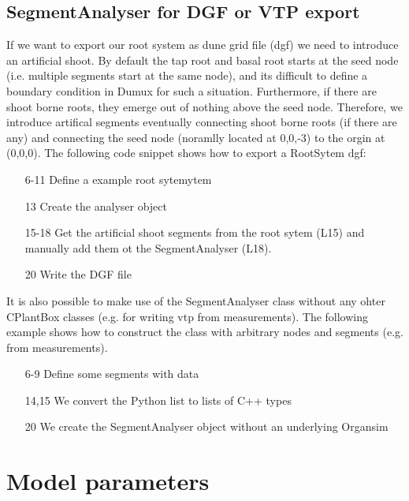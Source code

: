 \documentclass[a4paper]{article}
\begin{document}
\subsection{SegmentAnalyser for DGF or VTP export}

If we want to export our root system as dune grid file (dgf) we need to introduce an artificial shoot. By default the tap root and basal root starts at the seed node (i.e. multiple segments start at the same node), and its difficult to define a boundary condition in Dumux for such a situation. Furthermore, if there are shoot borne roots, they emerge out of nothing above the seed node. Therefore, we introduce artifical segments eventually connecting shoot borne roots (if there are any) and connecting the seed node (noramlly located at 0,0,-3) to the orgin at (0,0,0). The following code snippet shows how to export a RootSytem dgf:



\begin{itemize}
 \item[6-11] Define a example root sytemytem
 \item[13] Create the analyser object
 \item[15-18] Get the artificial shoot segments from the root sytem (L15) and manually add them ot the SegmentAnalyser (L18).
 \item[20] Write the DGF file 
\end{itemize}

It is also possible to make use of the SegmentAnalyser class without any ohter CPlantBox classes (e.g. for writing vtp from measurements). The following example shows how to construct the class with arbitrary nodes and segments (e.g. from measurements). 



\begin{itemize}
 \item[6-9] Define some segments with data
 \item[14,15] We convert the Python list to lists of C++ types
 \item[20] We create the SegmentAnalyser object without an underlying Organsim
\end{itemize}



\section{Model parameters} %
\end{document}
